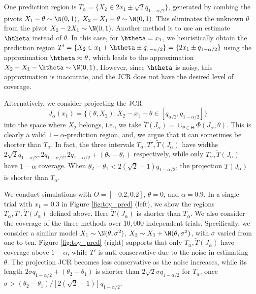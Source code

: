 \documentclass[english]{article}
\begin{document}
One prediction region is $T_\alpha= \{X_2 \in 2x_1 \pm \sqrt{2}q_{1-\alpha/2}\}$,  generated by combing the pivots $X_1 - \theta \sim \N(0,1)$, $X_2 - X_1 - \theta \sim \N(0,1)$. 
This eliminates the unknown $\theta$ from the pivot $X_2 - 2X_1 \sim \N(0,1)$. 
Another method is to use an estimate $\htheta$ instead of $\theta$. 
In this case, for $\htheta = x_1$, we 
heuristically obtain the prediction region $T'= \{X_2 \in x_1 + \htheta \pm q_{1-\alpha/2}\} = \{2x_1 \pm q_{1-\alpha/2}\}$
using 
the approximation $\htheta\approx \theta$, which leads to 
the approximation
$X_2 - X_1 - \htheta \sim \N(0,1)$.
However, since $\htheta$ is noisy,
this approximation is inaccurate, and the JCR does not have the desired level of coverage.

Alternatively, we consider projecting the JCR $$
J_\alpha(x_1) = \{(\theta,X_2): X_2-x_1 - \theta \in [q_{\alpha/2},q_{1-\alpha/2}]\}
$$
into the space where $X_2$ belongs, i.e., we take
$\tilde{T}(J_{\alpha}) = \cup_{\theta \in \Theta} \Phi(J_\alpha,\theta).$
This is clearly a valid $1-\alpha$-prediction region,
and, we argue that it can sometimes be shorter than $T_\alpha$.
 In fact, the three intervals $T_\alpha, T', \tilde{T}(J_{\alpha})$ have widths $2\sqrt{2}q_{1-\alpha/2}, 2q_{1-\alpha/2}, 2q_{1-\alpha/2}+(\theta_2-\theta_1)$ respectively, while only $T_\alpha, \tilde{T}(J_{\alpha})$ have $1-\alpha$ coverage. 
 When $\theta_2 - \theta_1 < 2(\sqrt{2}-1)q_{1-\alpha/2}$, the projection $\tilde{T}(J_{\alpha})$ 
 is shorter than $T_\alpha$.
 
 We conduct simulations 
 with $\Theta = [-0.2,0.2]$, $\theta = 0$,
 and  $\alpha = 0.9$. 
 In a single trial with $x_1 = 0.3$ in Figure \ref{fig:toy_pred} (left), we show the regions $T_\alpha, T', \tilde{T}(J_{\alpha})$ defined above. 
 Here $\tilde{T}(J_{\alpha})$ is shorter than $T_\alpha$. 
 We also consider the coverage of the three methods over $10,000$ independent trials. 
 Specifically, we consider a similar model $X_1 \sim \N(\theta,\sigma^2)$, $X_2 \sim X_1 + \N(\theta,\sigma^2)$, with $\sigma$ varied from one to ten. 
 Figure \ref{fig:toy_pred} (right) 
 supports that only $T_\alpha, \tilde{T}(J_{\alpha})$ 
 have coverage above $1-\alpha$, 
 while $T'$ is anti-conservative due to the noise in estimating $\theta$. 
 The projection JCR becomes less conservative as the noise increases, 
 while its length $2 \sigma q_{1-\alpha/2} + (\theta_2 - \theta_1)$
 is shorter than  $2 \sqrt{2} \sigma q_{1-\alpha/2}$ for $T_{\alpha}$, once $\sigma > (\theta_2-\theta_1)/[2(\sqrt{2}-1)]q_{1-\alpha/2}$.
 
\end{document}
